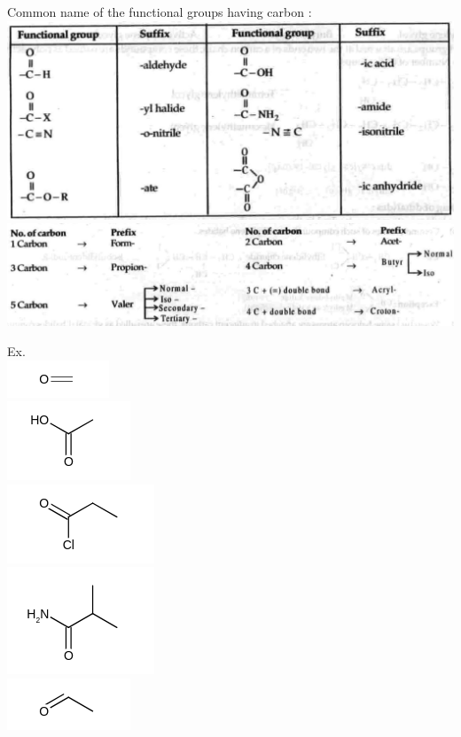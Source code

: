 \documentclass[10pt]{article}
\begin{document}
Common name of the functional groups having carbon :\\
\includegraphics[max width=\textwidth, center]{2025_01_28_8470952b98110cec3aabg-014(1)}\\
\includegraphics[max width=\textwidth, center]{2025_01_28_8470952b98110cec3aabg-014}

Ex.\\
\includegraphics{smile-141f3f6df1755919faea12e8add1ce78b8cad1b0}\\
\includegraphics{smile-6294ab28269a31048369c56354f06664a68bafa1}\\
\includegraphics{smile-4a7c98a6413dbf2b0348cbe52b2f9ca7d272cca3}\\
\includegraphics{smile-05b74c8919d24c966d50040901dc681614b2f864}\\
\includegraphics{smile-710cde5de6d3243827a3e669cdc3f10ca6853844}
\end{document}
